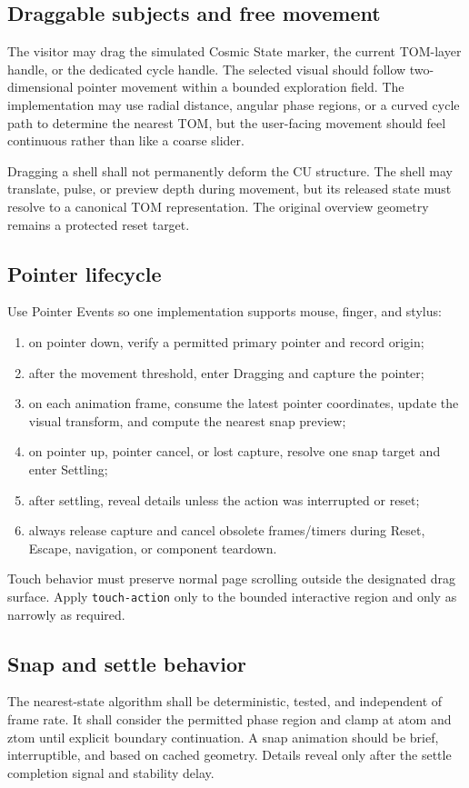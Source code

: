 \documentclass[11pt,letterpaper]{article}
\begin{document}
\subsection{Draggable subjects and free movement}
The visitor may drag the simulated Cosmic State marker, the current TOM-layer handle, or the dedicated cycle handle. The selected visual should follow two-dimensional pointer movement within a bounded exploration field. The implementation may use radial distance, angular phase regions, or a curved cycle path to determine the nearest TOM, but the user-facing movement should feel continuous rather than like a coarse slider.

Dragging a shell shall not permanently deform the CU structure. The shell may translate, pulse, or preview depth during movement, but its released state must resolve to a canonical TOM representation. The original overview geometry remains a protected reset target.

\subsection{Pointer lifecycle}
Use Pointer Events so one implementation supports mouse, finger, and stylus:
\begin{enumerate}
\item on pointer down, verify a permitted primary pointer and record origin;
\item after the movement threshold, enter Dragging and capture the pointer;
\item on each animation frame, consume the latest pointer coordinates, update the visual transform, and compute the nearest snap preview;
\item on pointer up, pointer cancel, or lost capture, resolve one snap target and enter Settling;
\item after settling, reveal details unless the action was interrupted or reset;
\item always release capture and cancel obsolete frames/timers during Reset, Escape, navigation, or component teardown.
\end{enumerate}

Touch behavior must preserve normal page scrolling outside the designated drag surface. Apply \texttt{touch-action} only to the bounded interactive region and only as narrowly as required.

\subsection{Snap and settle behavior}
The nearest-state algorithm shall be deterministic, tested, and independent of frame rate. It shall consider the permitted phase region and clamp at atom and ztom until explicit boundary continuation. A snap animation should be brief, interruptible, and based on cached geometry. Details reveal only after the settle completion signal and stability delay.
\end{document}
